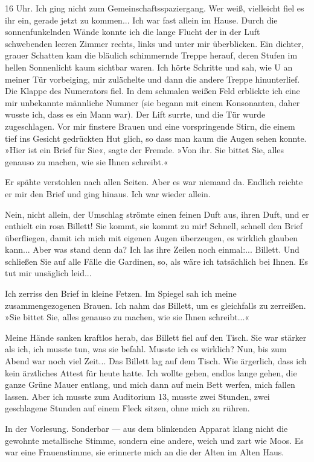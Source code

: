 16 Uhr. Ich ging nicht zum Gemeinschaftsspaziergang. Wer weiß,
vielleicht fiel es ihr ein, gerade jetzt zu kommen... Ich war fast
allein im Hause. Durch die sonnenfunkelnden Wände konnte ich die
lange Flucht der in der Luft schwebenden leeren Zimmer rechts,
links und unter mir überblicken. Ein dichter, grauer Schatten kam
die bläulich schimmernde Treppe herauf, deren Stufen im hellen
Sonnenlicht kaum sichtbar waren. Ich hörte Schritte und sah, wie U
an meiner Tür vorbeiging, mir zulächelte und dann die andere Treppe
hinunterlief. Die Klappe des Numerators fiel. In dem schmalen
weißen Feld erblickte ich eine mir unbekannte männliche Nummer (sie
begann mit einem Konsonanten, daher wusste ich, dass es ein Mann
war). Der Lift surrte, und die Tür wurde zugeschlagen. Vor mir
finstere Brauen und eine vorspringende Stirn, die einem tief ins
Gesicht gedrückten Hut glich, so dass man kaum die Augen sehen
konnte. »Hier ist ein Brief für Sie«, sagte der Fremde. »Von ihr.
Sie bittet Sie, alles genauso zu machen, wie sie Ihnen schreibt.«

Er spähte verstohlen nach allen Seiten. Aber es war niemand da.
Endlich reichte er mir den Brief und ging hinaus. Ich war wieder
allein.

Nein, nicht allein, der Umschlag strömte einen feinen Duft aus,
ihren Duft, und er enthielt ein rosa Billett! Sie kommt, sie kommt
zu mir! Schnell, schnell den Brief überfliegen, damit ich mich mit
eigenen Augen überzeugen, es wirklich glauben kann... Aber was
stand denn da? Ich las ihre Zeilen noch einmal:... Billett. Und
schließen Sie auf alle Fälle die Gardinen, so, als wäre ich
tatsächlich bei Ihnen. Es tut mir unsäglich leid...

Ich zerriss den Brief in kleine Fetzen. Im Spiegel sah ich meine
zusammengezogenen Brauen. Ich nahm das Billett, um es gleichfalls
zu zerreißen. »Sie bittet Sie, alles genauso zu machen, wie sie
Ihnen schreibt...«

Meine Hände sanken kraftlos herab, das Billett fiel auf den Tisch.
Sie war stärker als ich, ich musste tun, was sie befahl. Musste ich
es wirklich? Nun, bis zum Abend war noch viel Zeit... Das Billett
lag auf dem Tisch. Wie ärgerlich, dass ich kein ärztliches Attest
für heute hatte. Ich wollte gehen, endlos lange gehen, die ganze
Grüne Mauer entlang, und mich dann auf mein Bett werfen, mich
fallen lassen. Aber ich musste zum Auditorium 13, musste zwei
Stunden, zwei geschlagene Stunden auf einem Fleck sitzen, ohne mich
zu rühren.

In der Vorlesung. Sonderbar — aus dem blinkenden Apparat klang
nicht die gewohnte metallische Stimme, sondern eine andere, weich
und zart wie Moos. Es war eine Frauenstimme, sie erinnerte mich an
die der Alten im Alten Haus.

